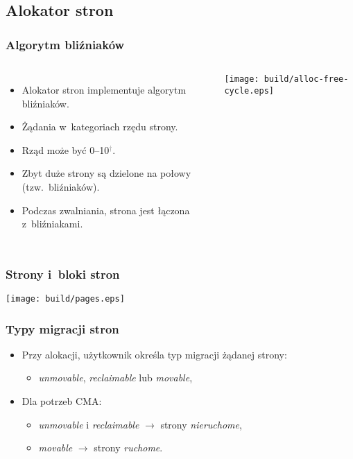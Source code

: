
\subsection{Alokator stron}

\begin{frame}
  \frametitle{Algorytm bliźniaków}
  \begin{columns}[c]

    \begin{itemize}
    \item Alokator stron implementuje algorytm bliźniaków.
    \item Żądania w~kategoriach rzędu strony.
    \item Rząd może być 0--10\textcolor{gray}{$^\dagger$}.
    \item Zbyt duże strony są dzielone na połowy (tzw.\ bliźniaków).
    \item Podczas zwalniania, strona jest łączona z~bliźniakami.
    \end{itemize}

    \begin{center}
    \texttt{[image: build/alloc-free-cycle.eps]}
    \end{center}
  \end{columns}
\end{frame}

\begin{frame}
  \frametitle{Strony i~bloki stron}
  \begin{center}
  \texttt{[image: build/pages.eps]}
  \end{center}
\end{frame}

\begin{frame}[fragile]
  \frametitle{Typy migracji stron}

  \begin{itemize}
  \item Przy alokacji, użytkownik określa typ migracji żądanej strony:
    \begin{itemize}
    \item {\it unmovable}, {\it reclaimable} lub {\it movable},
    \end{itemize}
  \item Dla potrzeb CMA:
    \begin{itemize}
    \item {\it unmovable} i {\it reclaimable} $\rightarrow$ strony
      \textsl{nieruchome},
    \item {\it movable} $\rightarrow$ strony \textsl{ruchome}.
    \end{itemize}
  \end{itemize}
\end{frame}

